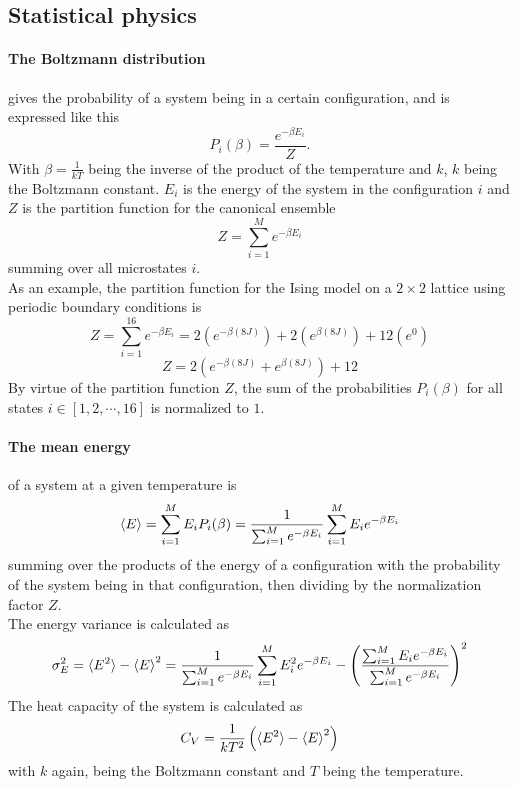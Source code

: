 \documentclass[10pt,a4paper]{article}
\begin{document}
\subsection{Statistical physics}
\paragraph{The Boltzmann distribution}gives the probability of a system being in a certain configuration, and is expressed like this
\begin{equation}
P_i(\beta) = \frac{e^{-\beta E_i}}{Z}.
\end{equation}
With $\beta = \frac{1}{kT}$ being the inverse of the product of the temperature and $k$, $k$ being the Boltzmann constant. $E_i$ is the energy of the system in the configuration $i$ and $Z$ is the partition function for the canonical ensemble
\begin{equation}
Z = \sum_{i=1}^M e^{-\beta E_i}
\end{equation}
summing over all microstates $i$. \cite{Lecture_Notes_Fall_2015}\\As an example, the partition function for the Ising model on a $2\times2$ lattice using periodic boundary conditions is
\begin{equation}
Z = \sum_{i=1}^{16} e^{-\beta E_i} = 2\left( e^{-\beta (8J)} \right) +2\left( e^{\beta (8J)} \right) +12\left( e^{0} \right)
\end{equation}
\begin{equation}
Z =  2\left( e^{-\beta (8J)} +e^{\beta (8J)} \right)+12
\end{equation}
By virtue of the partition function $Z$, the sum of the probabilities $P_i(\beta)$ for all states $i \in [1,2,\cdots,16]$ is normalized to $1$. 
\paragraph{The mean energy} of a system at a given temperature is 
\begin{equation}\label{mean energy equation}
\braket{E} = \sum_{i=1}^{M} E_iP_i(\beta) = \frac{1}{\sum_{i=1}^M e^{-\beta E_i}} \sum_{i=1}^M E_ie^{-\beta E_i}
\end{equation}
summing over the products of the energy of a configuration with the probability of the system being in that configuration, then dividing by the normalization factor $Z$.\\The energy variance is calculated as
\begin{equation}\label{C_V definition equation}
\sigma_E^2 = \braket{E^2}-\braket{E}^2 = \frac{1}{\sum_{i=1}^M e^{-\beta E_i}} \sum_{i=1}^M E_i^2e^{-\beta E_i} - \left( \frac{\sum_{i=1}^M E_ie^{-\beta E_i}}{\sum_{i=1}^M e^{-\beta E_i}} \right)^2
\end{equation}
The heat capacity of the system is calculated as 
\begin{equation}
C_V = \frac{1}{kT^2} \left(  \braket{E^2}-\braket{E}^2  \right)
\end{equation}
with $k$ again, being the Boltzmann constant and $T$ being the temperature.
\end{document}
